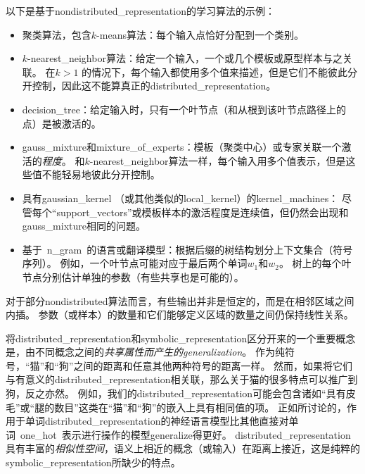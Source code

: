 以下是基于\gls{nondistributed_representation}的学习算法的示例：
\begin{itemize}
	\item 聚类算法，包含$k$-means算法：每个输入点恰好分配到一个类别。

	\item $k$-\gls{nearest_neighbor}算法：给定一个输入，一个或几个模板或原型样本与之关联。
	在$k >  1$ 的情况下，每个输入都使用多个值来描述，但是它们不能彼此分开控制，因此这不能算真正的\gls{distributed_representation}。

	\item \gls{decision_tree}：给定输入时，只有一个叶节点（和从根到该叶节点路径上的点）是被激活的。

	\item \gls{gauss_mixture}和\gls{mixture_of_experts}：模板（聚类中心）或专家关联一个激活的\emph{程度}。
	和$k$-\gls{nearest_neighbor}算法一样，每个输入用多个值表示，但是这些值不能轻易地彼此分开控制。

	\item 具有\gls{gaussian_kernel} （或其他类似的\gls{local_kernel}）的\gls{kernel_machines}： 尽管每个``\gls{support_vectors}''或模板样本的激活程度是连续值，但仍然会出现和\gls{gauss_mixture}相同的问题。


	\item 基于~\gls{n_gram}~的语言或翻译模型：根据后缀的树结构划分上下文集合（符号序列）。
	例如，一个叶节点可能对应于最后两个单词$w_1$和$w_2$。
	树上的每个叶节点分别估计单独的参数（有些共享也是可能的）。
\end{itemize}




对于部分\gls{nondistributed}算法而言，有些输出并非是恒定的，而是在相邻区域之间内插。
参数（或样本）的数量和它们能够定义区域的数量之间仍保持线性关系。


将\gls{distributed_representation}和\gls{symbolic_representation}区分开来的一个重要概念是，由不同概念之间的\emph{共享属性而产生的\gls{generalization}}。
作为纯符号，``猫''和``狗''之间的距离和任意其他两种符号的距离一样。
然而，如果将它们与有意义的\gls{distributed_representation}相关联，那么关于猫的很多特点可以推广到狗，反之亦然。
例如，我们的\gls{distributed_representation}可能会包含诸如``具有皮毛''或``腿的数目''这类在``猫''和``狗''的嵌入上具有相同值的项。
正如所讨论的，作用于单词\gls{distributed_representation}的神经语言模型比其他直接对单词~\gls{one_hot}~表示进行操作的模型\gls{generalize}得更好。
\gls{distributed_representation}具有丰富的\emph{相似性空间}，语义上相近的概念（或输入）在距离上接近，这是纯粹的\gls{symbolic_representation}所缺少的特点。

